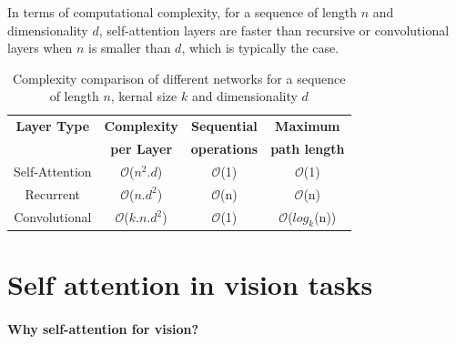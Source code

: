 In terms of computational complexity, for a sequence of length $n$ and dimensionality $d$, self-attention layers are faster than recursive or convolutional layers when $n$ is smaller than $d$, which is typically the case.

\begin{table}[ht]
\begin{center}
\vspace{.1in}
\begin{tabular}{cccc}
\hline
\textbf{Layer Type}     & \textbf{Complexity} & \textbf{Sequential } & \textbf{Maximum} \\
        & \textbf{per Layer} & \textbf{operations} & \textbf{ path length} \\\hline
Self-Attention & $\mathcal{O}$($n^2.d$)  & $\mathcal{O}$(1)    & $\mathcal{O}$(1)      \\
Recurrent      & $\mathcal{O}$($n.d^2$)  & $\mathcal{O}$(n)    & $\mathcal{O}$(n)      \\
Convolutional  & $\mathcal{O}$($k.n.d^2$) & $\mathcal{O}$(1)   & $\mathcal{O}$($log_k$(n))  \\\hline                      
\end{tabular}
\caption{Complexity comparison of different networks for a sequence of length $n$, kernal size $k$ and dimensionality $d$ \citep{vaswani2017attention} }
\label{tab:complexity}

\end{center}
\end{table}

\section{Self attention in vision tasks}

\paragraph{Why self-attention for vision?}

